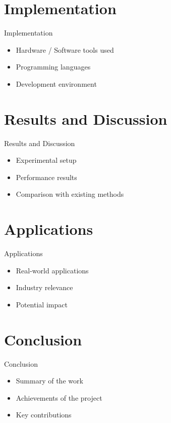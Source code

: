 \documentclass{beamer}
\begin{document}
\section{Implementation}

\begin{frame}{Implementation}
\begin{itemize}
\item Hardware / Software tools used
\item Programming languages
\item Development environment
\end{itemize}
\end{frame}

\section{Results and Discussion}

\begin{frame}{Results and Discussion}
\begin{itemize}
\item Experimental setup
\item Performance results
\item Comparison with existing methods
\end{itemize}
\end{frame}

\section{Applications}

\begin{frame}{Applications}
\begin{itemize}
\item Real-world applications
\item Industry relevance
\item Potential impact
\end{itemize}
\end{frame}

\section{Conclusion}

\begin{frame}{Conclusion}
\begin{itemize}
\item Summary of the work
\item Achievements of the project
\item Key contributions
\end{itemize}
\end{frame}
\end{document}
